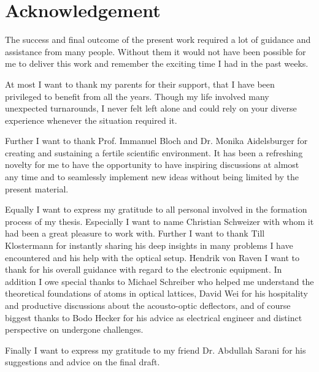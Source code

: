 \chapter*{Acknowledgement}

The success and final outcome of the present work required a lot of guidance
and assistance from many people. Without them it would not have been possible
for me to deliver this work and remember the exciting time I had in the past
weeks.

At most I want to thank my parents for their support, that I have been
privileged to benefit from all the years. Though my life involved many
unexpected turnarounds, I never felt left alone and could rely on your
diverse experience whenever the situation required it.

Further I want to thank Prof. Immanuel Bloch and Dr. Monika Aidelsburger for
creating and sustaining a fertile scientific environment. It has been a
refreshing novelty for me to have the opportunity to have inspiring
discussions at almost any time and to seamlessly implement new ideas without
being limited by the present material.

Equally I want to express my gratitude to all personal involved in the
formation process of my thesis. Especially I want to name Christian Schweizer
with whom it had been a great pleasure to work with. Further I want to thank
Till Klostermann for instantly sharing his deep insights in many problems I
have encountered and his help with the optical setup. Hendrik von Raven I want
to thank for his overall guidance with regard to the electronic equipment.
In addition I owe special thanks to Michael Schreiber who helped me understand
the theoretical foundations of atoms in optical lattices, David Wei for his
hospitality and productive discussions about the acousto-optic deflectors,
and of course biggest thanks to Bodo Hecker for his advice as electrical
engineer and distinct perspective on undergone challenges.

Finally I want to express my gratitude to my friend Dr. Abdullah Sarani for
his suggestions and advice on the final draft.
